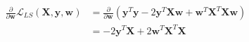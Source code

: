 \newcommand{\matrix}[1]{\mathbf{#1}}
\newcommand{\vector}[1]{\mathbf{#1}}
\newcommand{\X}{\matrix{X}}
\newcommand{\y}{\vector{y}}
\newcommand{\w}{\vector{w}}
\begin{align*}
\frac{\partial}{\partial \w} \mathcal{L}_{LS}(\X,\y,\w) &= \frac{\partial}{\partial \w} \left( \y^T\y - 2\y^T\X\w + \w^T\X^T\X\w \right) \\
&= -2\y^T\X + 2\w^T\X^T\X \\
\end{align*}
